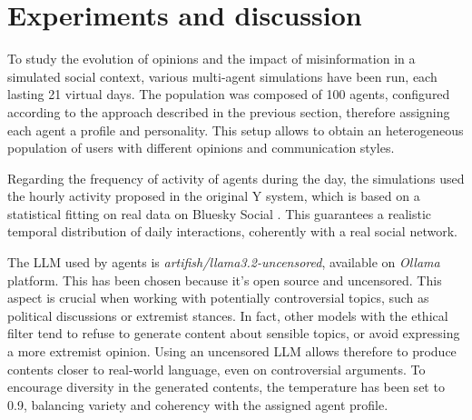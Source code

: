 \section{Experiments and discussion} %
\label{sec:experiments}

To study the evolution of opinions and the impact of misinformation in a simulated social context, various multi-agent simulations have been run, each lasting 21 virtual days.
The population was composed of 100 agents, configured according to the approach described in the previous section, therefore assigning each agent a profile and personality.
This setup allows to obtain an heterogeneous population of users with different opinions and communication styles.

Regarding the frequency of activity of agents during the day, the simulations used the hourly activity proposed in the original Y system, which is based on a statistical fitting on real data on Bluesky Social \cite{rossetti2024ysocialllmpoweredsocial, failla2024}.
This guarantees a realistic temporal distribution of daily interactions, coherently with a real social network.

\medskip
The LLM used by agents is \textit{artifish/llama3.2-uncensored}, available on \textit{Ollama} platform. 
This has been chosen because it's open source and uncensored.
This aspect is crucial when working with potentially controversial topics, such as political discussions or extremist stances.
In fact, other models with the ethical filter tend to refuse to generate content about sensible topics, or avoid expressing a more extremist opinion.
Using an uncensored LLM allows therefore to produce contents closer to real-world language, even on controversial arguments.
To encourage diversity in the generated contents, the temperature has been set to 0.9, balancing variety and coherency with the assigned agent profile.

